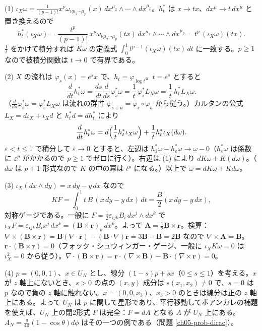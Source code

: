 \begin{solution}
(1) $\iota_X\omega=\frac{1}{(p-1)!}x^\nu\omega_{\nu\mu_2\cdots\mu_p}(x)\,dx^{\mu_2}\wedge\cdots\wedge dx^{\mu_p}$。$h_t^*$ は $x\to tx$、$dx^\mu\to t\,dx^\mu$ と置き換えるので
\[
h_t^*(\iota_X\omega)=\frac{t^p}{(p-1)!}\,x^\nu\omega_{\nu\mu_2\cdots\mu_p}(tx)\,dx^{\mu_2}\wedge\cdots\wedge dx^{\mu_p}=t^p\,(\iota_X\omega)(tx).
\]
$\frac1t$ をかけて積分すれば $K\omega$ の定義式 $\int_0^1t^{p-1}(\iota_X\omega)(tx)\,dt$ に一致する。$p\ge1$ なので被積分関数は $t\to0$ で有界である。

(2) $X$ の流れは $\varphi_s(x)=e^sx$ で、$h_t=\varphi_{\log t}$。$t=e^s$ とすると
\[
\frac{d}{dt}h_t^*\omega=\frac{ds}{dt}\frac{d}{ds}\varphi_s^*\omega=\frac1t\,\varphi_s^*L_X\omega=\frac1t\,h_t^*L_X\omega .
\]
（$\frac{d}{ds}\varphi_s^*\omega=\varphi_s^*L_X\omega$ は流れの群性 $\varphi_{s+u}=\varphi_s\circ\varphi_u$ から従う。）カルタンの公式 $L_X=d\iota_X+\iota_Xd$ と $h_t^*d=dh_t^*$ により
\[
\frac{d}{dt}h_t^*\omega=d\Bigl(\frac1th_t^*\iota_X\omega\Bigr)+\frac1th_t^*\iota_X(d\omega).
\]
$\varepsilon<t\le1$ で積分して $\varepsilon\to0$ とすると、左辺は $h_1^*\omega-h_\varepsilon^*\omega\to\omega-0$（$h_\varepsilon^*\omega$ は係数に $\varepsilon^p$ がかかるので $p\ge1$ でゼロに行く）。右辺は (1) により $dK\omega+K(d\omega)$。（$d\omega$ は $p+1$ 形式なので $K$ の中の冪は $t^{p}$ になる。）以上で $\omega=dK\omega+Kd\omega$。

(3) $\iota_X(dx\wedge dy)=x\,dy-y\,dx$ なので
\[
KF=\int_0^1t\,B\,(x\,dy-y\,dx)\,dt=\frac B2(x\,dy-y\,dx),
\]
対称ゲージである。一般に $F=\frac12\varepsilon_{ijk}B_i\,dx^j\wedge dx^k$ で $\iota_XF=\varepsilon_{ijk}B_ix^j\,dx^k=(\bm B\times\bm r)_k\,dx^k$。よって $\bm A=\frac12\bm B\times\bm r$。検算：$\nabla\times(\bm B\times\bm r)=\bm B(\nabla\cdot\bm r)-(\bm B\cdot\nabla)\bm r=3\bm B-\bm B=2\bm B$ なので $\nabla\times\bm A=\bm B$。$\bm r\cdot(\bm B\times\bm r)=0$（フォック・シュウィンガー・ゲージ、一般に $\iota_XK\omega=0$ は $\iota_X^2=0$ から従う）。$\nabla\cdot(\bm B\times\bm r)=\bm r\cdot(\nabla\times\bm B)-\bm B\cdot(\nabla\times\bm r)=0$。

(4) $p=(0,0,1)$、$x\in U_N$ とし、線分 $(1-s)p+sx$（$0\le s\le1$）を考える。$x$ が $z$ 軸上にないとき、$s>0$ の点の $(x,y)$ 成分は $s(x_1,x_2)\neq0$ で、$s=0$ は $p$ なので負の $z$ 軸に触れない。$x=(0,0,x_3)$、$x_3>0$ のときは線分は正の $z$ 軸上にある。よって $U_N$ は $p$ に関して星形であり、平行移動してポアンカレの補題を使えば、$U_N$ 上の閉2形式 $F$ は完全：$F=dA$ となる $A$ が $U_N$ 上にある。$A_N=\frac{g}{4\pi}(1-\cos\theta)d\phi$ はその一つの例である（問題 \ref{ch05-prob-dirac}）。
\end{solution}

